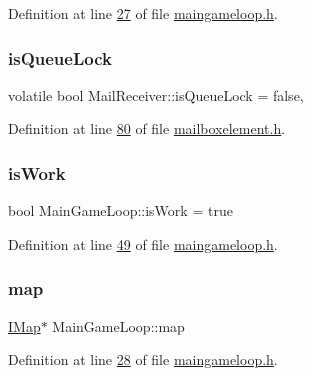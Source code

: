 Definition at line \hyperlink{a00092_source_l00027}{27} of file \hyperlink{a00092_source}{maingameloop.\+h}.

\mbox{\label{a00197_a33c370cb3c6292cd800008a67002a67f}} 
\subsubsection{\texorpdfstring{is\+Queue\+Lock}{isQueueLock}}
{\footnotesize\ttfamily volatile bool Mail\+Receiver\+::is\+Queue\+Lock = false\hspace{0.3cm}{\ttfamily [protected]}, {\ttfamily [inherited]}}



Definition at line \hyperlink{a00002_source_l00080}{80} of file \hyperlink{a00002_source}{mailboxelement.\+h}.

\mbox{\label{a00209_a03ce2a112152dc80acce53528cc65daf}} 
\subsubsection{\texorpdfstring{is\+Work}{isWork}}
{\footnotesize\ttfamily bool Main\+Game\+Loop\+::is\+Work = true\hspace{0.3cm}{\ttfamily [protected]}}



Definition at line \hyperlink{a00092_source_l00049}{49} of file \hyperlink{a00092_source}{maingameloop.\+h}.

\mbox{\label{a00209_ae0ccec14d7db91cf6db41349a73b41a7}} 
\subsubsection{\texorpdfstring{map}{map}}
{\footnotesize\ttfamily \hyperlink{a00165}{I\+Map}$\ast$ Main\+Game\+Loop\+::map\hspace{0.3cm}{\ttfamily [private]}}



Definition at line \hyperlink{a00092_source_l00028}{28} of file \hyperlink{a00092_source}{maingameloop.\+h}.

